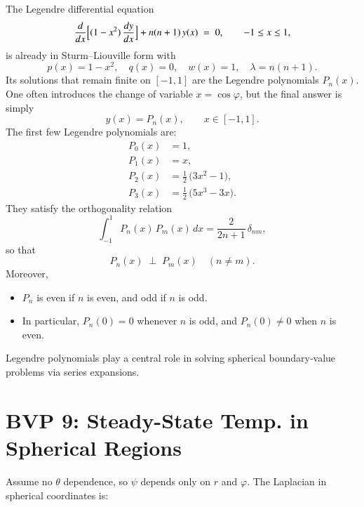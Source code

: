 \documentclass{report}
\begin{document}
The Legendre differential equation
\[
\frac{d}{dx}\Bigl[(1 - x^{2})\,\frac{dy}{dx}\Bigr] + n(n+1)\,y(x) \;=\; 0,
\qquad -1 \le x \le 1,
\]
is already in Sturm–Liouville form with 
\[
p(x) = 1 - x^{2}, 
\quad
q(x) = 0, 
\quad
w(x) = 1, 
\quad
\lambda = n(n+1).
\]
Its solutions that remain finite on \([-1,1]\) are the Legendre polynomials \(P_{n}(x)\).  One often introduces the change of variable \(x=\cos\varphi\), but the final answer is simply
\[
y(x) = P_{n}(x), 
\qquad x \in [-1,1].
\]
The first few Legendre polynomials are:
\[
\begin{aligned}
P_{0}(x) &= 1,\\
P_{1}(x) &= x,\\
P_{2}(x) &= \frac{1}{2}\,\bigl(3x^{2} - 1\bigr),\\
P_{3}(x) &= \frac{1}{2}\,\bigl(5x^{3} - 3x\bigr).
\end{aligned}
\]
They satisfy the orthogonality relation
\[
\int_{-1}^{1} P_{n}(x)\,P_{m}(x)\,dx = \frac{2}{2n+1}\,\delta_{nm},
\]
so that
\[
P_{n}(x)\;\perp\;P_{m}(x)\quad(n\neq m).
\]
Moreover,
\begin{itemize}
  \item \(P_{n}\) is even if \(n\) is even, and odd if \(n\) is odd.
  \item In particular, \(P_{n}(0) = 0\) whenever \(n\) is odd, and \(P_{n}(0)\neq 0\) when \(n\) is even.
\end{itemize}
Legendre polynomials play a central role in solving spherical boundary‐value problems via series expansions.

\section{BVP 9: Steady-State Temp. in Spherical Regions}

Assume no \(\theta\) dependence, so \(\psi\) depends only on \(r\) and \(\varphi\).  The Laplacian in spherical coordinates is:
\end{document}

